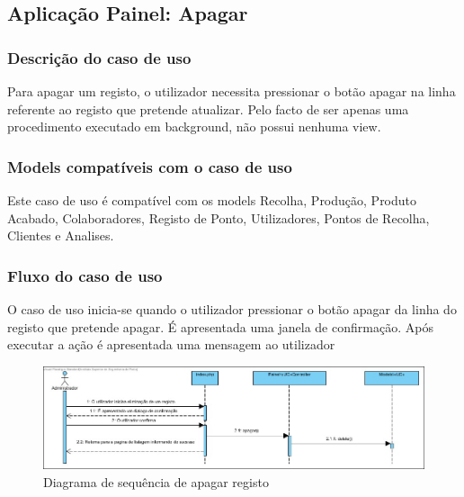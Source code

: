 \subsection{Aplicação Painel: Apagar}
\subsubsection*{Descrição do caso de uso}
Para apagar um registo, o utilizador necessita pressionar o botão apagar na linha referente ao registo que pretende atualizar. Pelo facto de ser apenas uma procedimento executado em background, não possui nenhuma view.

\subsubsection*{Models compatíveis com o caso de uso}
Este caso de uso é compatível com os models Recolha, Produção, Produto Acabado, Colaboradores, Registo de Ponto, Utilizadores, Pontos de Recolha, Clientes e Analises.

\subsubsection*{Fluxo do caso de uso}
O caso de uso inicia-se quando o utilizador pressionar o botão apagar da linha do registo que pretende apagar. É apresentada uma janela de confirmação. Após executar a ação é apresentada uma mensagem ao utilizador


\begin{figure}[H] 
	\begin{center}
		\includegraphics[width=\textwidth,keepaspectratio]{figuras/Diagramas_vp/SD_Painel_4_Apagar.jpg}
		\caption{Diagrama de sequência de apagar registo}
		\label{fig:sd_apagar} 
	\end{center}
\end{figure}